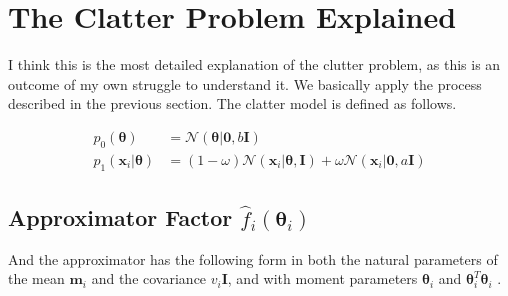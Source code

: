 \documentclass[a4]{article}
\begin{document}
\section{The Clatter Problem Explained}
I think this is the most detailed explanation of the clutter problem, as this is an outcome of my own
struggle to understand it.
We basically apply the process described in the previous section.
The clatter model is defined as follows.

\begin{equation}
\begin{aligned}
p_0(\bm{\theta})            &= \mathcal{N}(\bm{\theta}|\bm{0}, b\bm{I})\\
p_1(\bm{x}_i | \bm{\theta}) &= (1-\omega)\mathcal{N}(\bm{x}_i|\bm{\theta},\bm{I}) +
\omega\mathcal{N}(\bm{x}_i|\bm{0},a\bm{I})\label{eq:clatter_definition}
\end{aligned}
\end{equation}

\subsection {Approximator Factor $\hat{f}_i(\bm{\theta}_i)$}

And the approximator has the following form in both the natural parameters of 
the mean $\bm{m}_i$ and the covariance $v_i\bm{I}$,
and with moment parameters $\bm{\theta}_i$ and $\bm{\theta}_i^T\bm{\theta}_i$ .
\end{document}
